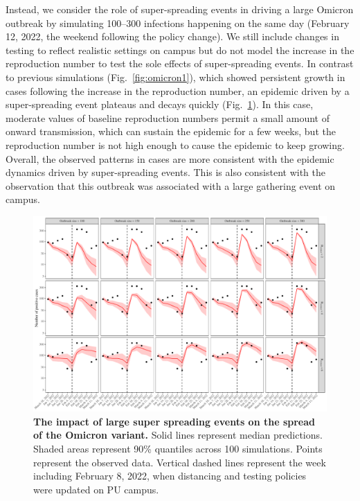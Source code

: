 \documentclass[12pt]{article}
\newcommand{\fref}[1]{Fig.~\ref{fig:#1}}
\begin{document}
Instead, we consider the role of super-spreading events in driving a large Omicron outbreak by simulating 100--300 infections happening on the same day (February 12, 2022, the weekend following the policy change).
We still include changes in testing to reflect realistic settings on campus but do not model the increase in the reproduction number to test the sole effects of super-spreading events.
In contrast to previous simulations (\fref{omicron1}), which showed persistent growth in cases following the increase in the reproduction number, an epidemic driven by a super-spreading event plateaus and decays quickly (\fref{omicron2}).
In this case, moderate values of baseline reproduction numbers permit a small amount of onward transmission, which can sustain the epidemic for a few weeks, but the reproduction number is not high enough to cause the epidemic to keep growing.
Overall, the observed patterns in cases are more consistent with the epidemic dynamics driven by super-spreading events.
This is also consistent with the observation that this outbreak was associated with a large gathering event on campus.

\begin{figure}[!thp]
\includegraphics[width=\textwidth]{../figure_princeton_new/figure_princeton_simulation_omicron_outbreak.pdf}
\caption{
\textbf{The impact of large super spreading events on the spread of the Omicron variant.}
Solid lines represent median predictions.
Shaded areas represent 90\% quantiles across 100 simulations.
Points represent the observed data.
Vertical dashed lines represent the week including February 8, 2022, when distancing and testing policies were updated on PU campus.
}
\label{fig:omicron2}
\end{figure}
\end{document}
